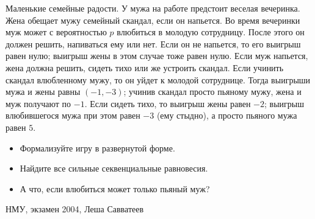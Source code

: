 \begin{problem}
 Маленькие семейные радости. У мужа на работе предстоит веселая вечеринка. Жена обещает мужу семейный скандал, если он напьется. Во время вечеринки муж может с вероятностью $p$ влюбиться в молодую сотрудницу. После этого он должен решить, напиваться ему или нет. Если он не напьется, то его выигрыш равен нулю; выигрыш жены в этом случае тоже равен нулю.
Если муж напьется, жена должна решить, сидеть тихо или же устроить скандал. Если учинить скандал влюбленному мужу, то он уйдет к молодой сотруднице. Тогда выигрыши мужа и жены равны $(-1,-3)$; учинив скандал просто пьяному мужу, жена и муж получают по $-1$. Если сидеть тихо, то выигрыш жены равен $-2$; выигрыш влюбившегося мужа при этом равен $-3$ (ему стыдно), а просто пьяного мужа равен $5$.
\begin{itemize}
\item Формализуйте игру в развернутой форме.
\item Найдите все сильные секвенциальные равновесия.
\item А что, если влюбиться может только пьяный муж?
\end{itemize}



\begin{source}
НМУ, экзамен 2004, Леша Савватеев
\end{source}


\begin{sol}

\end{sol}
\end{problem}





